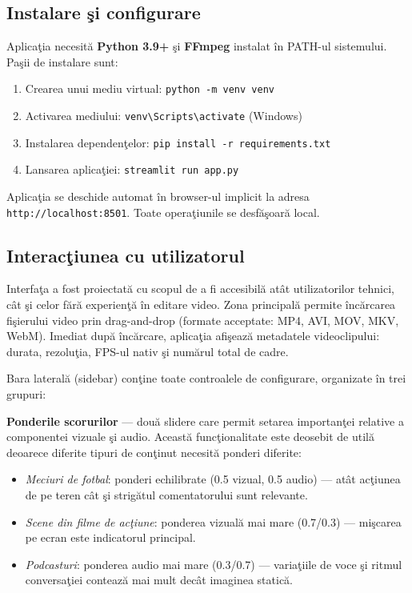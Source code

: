 \documentclass[12pt,a4paper]{article}
\begin{document}
\subsection{Instalare \c{s}i configurare}

Aplica\c{t}ia necesit\u{a}{} \textbf{Python 3.9+} \c{s}i \textbf{FFmpeg} instalat \^{i}n PATH-ul sistemului. Pa\c{s}ii de instalare sunt:
\begin{enumerate}[noitemsep]
    \item Crearea unui mediu virtual: \texttt{python -m venv venv}
    \item Activarea mediului: \texttt{venv\textbackslash Scripts\textbackslash activate} (Windows)
    \item Instalarea dependen\c{t}elor: \texttt{pip install -r requirements.txt}
    \item Lansarea aplica\c{t}iei: \texttt{streamlit run app.py}
\end{enumerate}

Aplica\c{t}ia se deschide automat \^{i}n browser-ul implicit la adresa \texttt{http://localhost:8501}. Toate opera\c{t}iunile se desf\u{a}\c{s}oar\u{a}{} local.

\subsection{Interac\c{t}iunea cu utilizatorul}

Interfa\c{t}a a fost proiectat\u{a}{} cu scopul de a fi accesibil\u{a}{} at\^{a}t utilizatorilor tehnici, c\^{a}t \c{s}i celor f\u{a}r\u{a}{} experien\c{t}\u{a}{} \^{i}n editare video. Zona principal\u{a}{} permite \^{i}nc\u{a}rcarea fi\c{s}ierului video prin drag-and-drop (formate acceptate: MP4, AVI, MOV, MKV, WebM). Imediat dup\u{a}{} \^{i}nc\u{a}rcare, aplica\c{t}ia afi\c{s}eaz\u{a}{} metadatele videoclipului: durata, rezolu\c{t}ia, FPS-ul nativ \c{s}i num\u{a}rul total de cadre.

Bara lateral\u{a}{} (sidebar) con\c{t}ine toate controalele de configurare, organizate \^{i}n trei grupuri:

\textbf{Ponderile scorurilor} --- dou\u{a}{} slidere care permit setarea importan\c{t}ei relative a componentei vizuale \c{s}i audio. Aceast\u{a}{} func\c{t}ionalitate este deosebit de util\u{a}{} deoarece diferite tipuri de con\c{t}inut necesit\u{a}{} ponderi diferite:
\begin{itemize}[noitemsep]
    \item \textit{Meciuri de fotbal}: ponderi echilibrate (0.5 vizual, 0.5 audio) --- at\^{a}t ac\c{t}iunea de pe teren c\^{a}t \c{s}i strig\u{a}tul comentatorului sunt relevante.
    \item \textit{Scene din filme de ac\c{t}iune}: ponderea vizual\u{a}{} mai mare (0.7/0.3) --- mi\c{s}carea pe ecran este indicatorul principal.
    \item \textit{Podcasturi}: ponderea audio mai mare (0.3/0.7) --- varia\c{t}iile de voce \c{s}i ritmul conversa\c{t}iei conteaz\u{a}{} mai mult dec\^{a}t imaginea static\u{a}.
\end{itemize}
\end{document}

